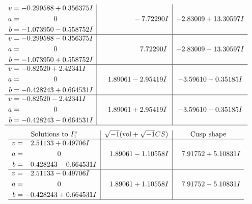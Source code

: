\documentclass[1p]{elsarticle_modified}
\theoremstyle{definition}
\newcommand{\I}{\sqrt{-1}}
\begin{document}
$$\begin{array}{c|c|c}
\begin{aligned}
v &= -0.299588 + 0.356375 I \\
a &= \phantom{-0.000000 } 0 \\
b &= -1.073950 - 0.558752 I\end{aligned}
 & \phantom{-0.000000 } -7.72290 I & -2.83009 + 13.30597 I \\ \hline\begin{aligned}
v &= -0.299588 - 0.356375 I \\
a &= \phantom{-0.000000 } 0 \\
b &= -1.073950 + 0.558752 I\end{aligned}
 & \phantom{-0.000000 -}7.72290 I & -2.83009 - 13.30597 I \\ \hline\begin{aligned}
v &= -0.82520 + 2.42341 I \\
a &= \phantom{-0.000000 } 0 \\
b &= -0.428243 + 0.664531 I\end{aligned}
 & \phantom{-}1.89061 - 2.95419 I & -3.59610 + 0.35185 I \\ \hline\begin{aligned}
v &= -0.82520 - 2.42341 I \\
a &= \phantom{-0.000000 } 0 \\
b &= -0.428243 - 0.664531 I\end{aligned}
 & \phantom{-}1.89061 + 2.95419 I & -3.59610 - 0.35185 I\\
 \hline 
 \end{array}$$\newpage$$\begin{array}{c|c|c}  
\text{Solutions to }I^v_{1}& \I (\text{vol} + \sqrt{-1}CS) & \text{Cusp shape}\\
 \hline 
\begin{aligned}
v &= \phantom{-}2.51133 + 0.49706 I \\
a &= \phantom{-0.000000 } 0 \\
b &= -0.428243 - 0.664531 I\end{aligned}
 & \phantom{-}1.89061 - 1.10558 I & \phantom{-}7.91752 + 5.10831 I \\ \hline\begin{aligned}
v &= \phantom{-}2.51133 - 0.49706 I \\
a &= \phantom{-0.000000 } 0 \\
b &= -0.428243 + 0.664531 I\end{aligned}
 & \phantom{-}1.89061 + 1.10558 I & \phantom{-}7.91752 - 5.10831 I\\
 \hline 
 \end{array}$$\newpage
\end{document}
